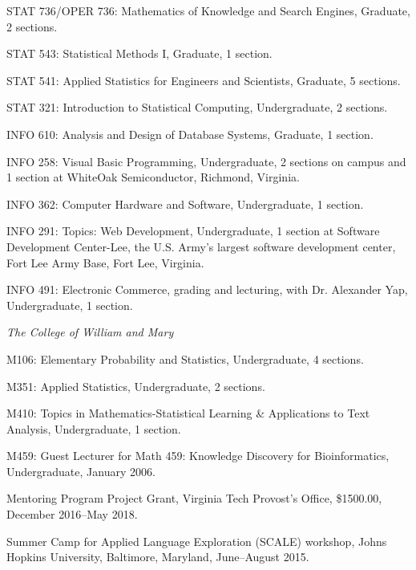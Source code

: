 \documentclass[11pt,article,oneside]{memoir}
\begin{document}
\ind STAT 736/OPER 736: Mathematics of Knowledge and Search Engines, Graduate, 2 sections.

\ind STAT 543: Statistical Methods I, Graduate, 1 section.

\ind STAT 541: Applied Statistics for Engineers and Scientists, Graduate, 5 sections.

\ind STAT 321: Introduction to Statistical Computing, Undergraduate, 2 sections.

\ind INFO 610: Analysis and Design of Database Systems, Graduate, 1 section.

\ind INFO 258: Visual Basic Programming, Undergraduate, 2 sections on campus and 1 section at WhiteOak Semiconductor, Richmond, Virginia.

\ind INFO 362: Computer Hardware and Software, Undergraduate, 1 section.

\ind INFO 291: Topics: Web Development, Undergraduate, 1 section at Software Development Center-Lee, the U.S. Army’s largest software development center, Fort Lee Army Base, Fort Lee, Virginia.

\ind INFO 491: Electronic Commerce, grading and lecturing, with Dr. Alexander Yap, Undergraduate, 1 section. 



\bigskip

\noindent\emph{The College of William and Mary \vspace{0.05in}}

\ind M106: Elementary Probability and Statistics, Undergraduate, 4 sections.

\ind M351: Applied Statistics, Undergraduate, 2 sections.

\ind M410: Topics in Mathematics-Statistical Learning \& Applications to Text Analysis, Undergraduate, 1 section.

\ind M459: Guest Lecturer for Math 459: Knowledge Discovery for Bioinformatics, Undergraduate, January 2006.

\bigskip


\ind Mentoring Program Project Grant, Virginia Tech Provost's Office, \$1500.00, December 2016--May 2018.

\ind Summer Camp for Applied Language Exploration (SCALE) workshop, Johns Hopkins University, Baltimore, Maryland, June--August 2015.
\end{document}
